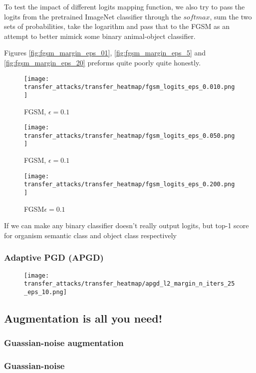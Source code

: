 To test the impact of different logits mapping function, we also try to pass the logits from the pretrained ImageNet classifier through the $softmax$, sum the two sets of probabilities, take the logarithm and pass that to the FGSM as an attempt to better mimick some binary animal-object classifier.


Figures \ref{fig:fgsm_margin_eps_01}, \ref{fig:fgsm_margin_eps_5} and \ref{fig:fgsm_margin_eps_20} preforms quite poorly quite honestly.

\begin{figure}[!htb]
  \texttt{[image: transfer\_attacks/transfer\_heatmap/fgsm\_logits\_eps\_0.010.png]}
  \caption{FGSM, $\epsilon = 0.1$}\label{fig:fgsm_logits_eps_01}
\endminipage\hfill
{}
  \texttt{[image: transfer\_attacks/transfer\_heatmap/fgsm\_logits\_eps\_0.050.png]}
  \caption{FGSM, $\epsilon = 0.1$}\label{fig:fgsm_logits_eps_10}
\endminipage\hfill
{}%
  \texttt{[image: transfer\_attacks/transfer\_heatmap/fgsm\_logits\_eps\_0.200.png]}
  \caption{FGSM$\epsilon = 0.1$}\label{label:fgsm_logits_eps_20}
\endminipage
\end{figure}


If we can make any binary classifier doesn't really output logits, but top-1 score for organism semantic class and object class respectively



\subsubsection{Adaptive PGD (APGD)}
\begin{figure}[h]
    \centering
    \texttt{[image: transfer\_attacks/transfer\_heatmap/apgd\_l2\_margin\_n\_iters\_25\_eps\_10.png]}
    \caption{}
    \label{fig:apgd_margin}
\end{figure}


\subsection{Augmentation is all you need!}
\subsubsection{Guassian-noise augmentation}

\subsubsection{Guassian-noise}
